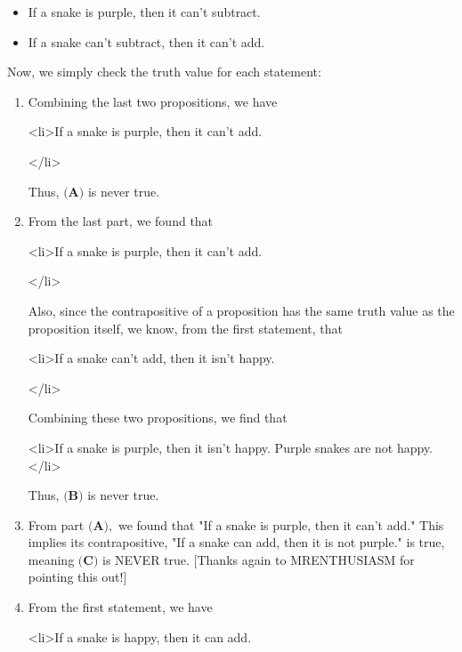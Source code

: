 \begin{enumerate}
            \begin{itemize}
        \item If a snake is purple, then it can't subtract.
            \end{itemize}
            
            \begin{itemize}
        \item If a snake can't subtract, then it can't add.
            \end{itemize}
            Now, we simply check the truth value for each statement: 

 
            \begin{enumerate} 
        \item Combining the last two propositions, we have
            \begin{itemize}<li>If a snake is purple, then it can't add. 

 </li>
            \end{itemize}
            Thus, $\textbf{(A)}$ is never true.

        \item From the last part, we found that
            \begin{itemize}<li>If a snake is purple, then it can't add. 

 </li>
            \end{itemize}
            Also, since the contrapositive of a proposition has the same truth value as the proposition itself, we know, from the first statement, that 
            \begin{itemize}<li>If a snake can't add, then it isn't happy. 

 </li>
            \end{itemize}
            Combining these two propositions, we find that 
            \begin{itemize}<li>If a snake is purple, then it isn't happy. Purple snakes are not happy.</li>

            \end{itemize}
            Thus, $\textbf{(B)}$ is never true.

        \item From part $\textbf{(A)},$ we found that "If a snake is purple, then it can't add." This implies its contrapositive, "If a snake can add, then it is not purple." is true, meaning $\textbf{(C)}$ is NEVER true. [Thanks again to MRENTHUSIASM for pointing this out!]

        \item From the first statement, we have 
            \begin{itemize}<li>If a snake is happy, then it can add.


\end{itemize}
\end{enumerate}
\end{enumerate}

